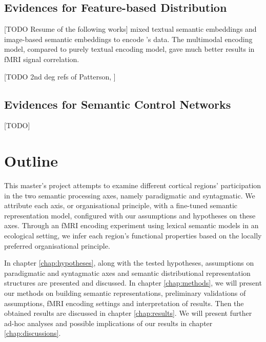 \parencite{huthContinuousSemanticSpace2012, huthNaturalSpeechReveals2016, mahonWhatDrivesOrganization2011, damasioNeuralBasisLexical1996, damasioNeuralSystemsWord2004}

\subsection{Evidences for Feature-based Distribution}

[TODO Resume of the following works]
\cite{borghesaniWordMeaningVentral2016}
\cite{rowtulaDeepAutoencoderNearPerfect2018} mixed textual semantic embeddings and image-based semantic embeddings to encode \cite{pereiraUniversalDecoderLinguistic2018}'s data. The multimodal encoding model, compared to purely textual encoding model, gave much better results in fMRI signal correlation.

[TODO 2nd deg refs of Patterson, ]

\subsection{Evidences for Semantic Control Networks}

[TODO]
\cite{ralphNeuralComputationalBases2017}

\section{Outline}

This master's project attempts to examine different cortical regions' participation in the two semantic processing axes, namely paradigmatic and syntagmatic. We attribute each axis, or organisational principle, with a fine-tuned semantic representation model, configured with our assumptions and hypotheses on these axes. 
Through an fMRI encoding experiment using lexical semantic models in an ecological setting, we infer each region's functional properties based on the locally preferred organisational principle.

In chapter \ref{chap:hypotheses}, along with the tested hypotheses, assumptions on paradigmatic and syntagmatic axes and semantic distributional representation structures are presented and discussed. In chapter \ref{chap:methods}, we will present our methods on building semantic representations, preliminary validations of assumptions, fMRI encoding settings and interpretation of results. Then the obtained results are discussed in chapter \ref{chap:results}. We will present further ad-hoc analyses and possible implications of our results in chapter \ref{chap:discussions}.